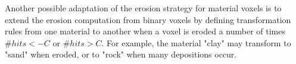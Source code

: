 Another possible adaptation of the erosion strategy for material voxels is to extend the erosion computation from binary voxels by defining transformation rules from one material to another when a voxel is eroded a number of times $\#hits < -C$ or $\#hits > C$. For example, the material "clay" may transform to "sand" when eroded, or to "rock" when many depositions occur.


